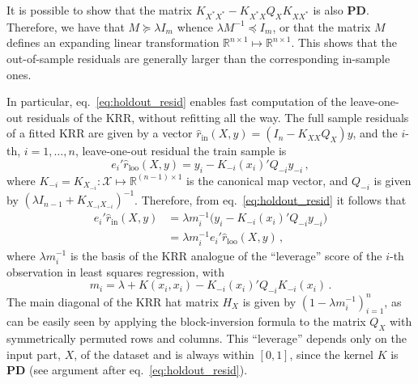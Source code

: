 \documentclass[a4paper,14pt]{extarticle}
\newcommand{\Xcal}{\mathcal{X}}
\newcommand{\Real}{\mathbb{R}}
\begin{document}
It is possible to show that the matrix $K_{X^*X^*} - K_{X^*X} Q_X K_{XX^*}$ is also
\textbf{PD}. Therefore, we have that $M \succeq \lambda I_m$ whence $\lambda M^{-1}
\preceq I_m$, or that the matrix $M$ defines an expanding linear transformation
$\Real^{n\times 1} \mapsto \Real^{n\times 1}$. This shows that the out-of-sample
residuals are generally larger than the corresponding in-sample ones.

In particular, eq.~\ref{eq:holdout_resid} enables fast computation of the leave-one-out
residuals of the KRR, without refitting all the way. The full sample residuals of a
fitted KRR are given by a vector $\hat{r}_{\text{in}}(X, y) = (I_n - K_{XX} Q_X) y$,
and the $i$-th, $i=1,\ldots, n$, leave-one-out residual the train sample is
\begin{equation}
  e_i' \hat{r}_{\text{loo}}(X, y)
  = y_i - K_{-i}(x_i)' Q_{-i} y_{-i} \,,
\end{equation}
where $K_{-i} = K_{X_{-i}}: \Xcal \mapsto \Real^{(n-1)\times1}$ is the canonical map
vector, and $Q_{-i}$ is given by $(\lambda I_{n-1} + K_{X_{-i}X_{-i}})^{-1}$.
Therefore, from eq.~\ref{eq:holdout_resid} it follows that
\begin{align}
  e_i' \hat{r}_{\text{in}}(X, y)
  &= \lambda m_i^{-1} \bigl(y_i - K_{-i}(x_i)' Q_{-i} y_{-i} \bigr) \nonumber \\
  &= \lambda m_i^{-1} e_i' \hat{r}_{\text{loo}}(X, y) \label{eq:loo_resid} \,,
\end{align}
where $\lambda m_i^{-1}$ is the basis of the KRR analogue of the ``leverage'' score
of the $i$-th observation in least squares regression, with
\begin{equation} \label{eq:krr_leverage}
  m_i = \lambda + K(x_i, x_i) - K_{-i}(x_i)' Q_{-i} K_{-i}(x_i) \,.
\end{equation}
The main diagonal of the KRR hat matrix $H_X$ is given by $(1-\lambda m_i^{-1})_{i=1}^n$,
as can be easily seen by applying the block-inversion formula to the matrix $Q_X$
with symmetrically permuted rows and columns. This ``leverage'' depends only on the
input part, $X$, of the dataset and is always within $[0, 1]$, since the kernel $K$
is \textbf{PD} (see argument after eq.~\ref{eq:holdout_resid}).
\end{document}
